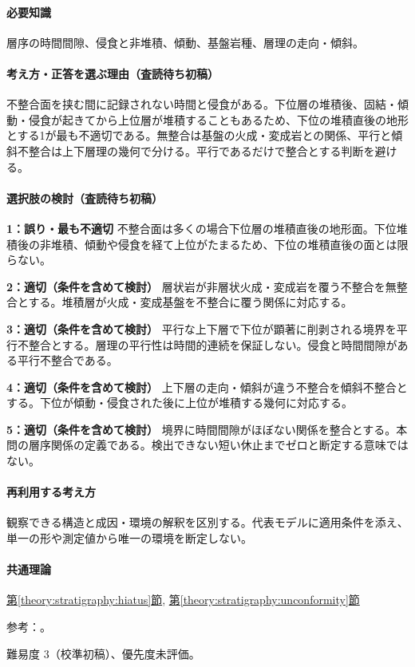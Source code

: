 \paragraph{必要知識} 層序の時間間隙、侵食と非堆積、傾動、基盤岩種、層理の走向・傾斜。

\paragraph{考え方・正答を選ぶ理由（査読待ち初稿）} 不整合面を挟む間に記録されない時間と侵食がある。下位層の堆積後、固結・傾動・侵食が起きてから上位層が堆積することもあるため、下位の堆積直後の地形とする1が最も不適切である。無整合は基盤の火成・変成岩との関係、平行と傾斜不整合は上下層理の幾何で分ける。平行であるだけで整合とする判断を避ける。

\paragraph{選択肢の検討（査読待ち初稿）}\mbox{}\par

\noindent\textbf{1：誤り・最も不適切} 不整合面は多くの場合下位層の堆積直後の地形面。下位堆積後の非堆積、傾動や侵食を経て上位がたまるため、下位の堆積直後の面とは限らない。\par

\noindent\textbf{2：適切（条件を含めて検討）} 層状岩が非層状火成・変成岩を覆う不整合を無整合とする。堆積層が火成・変成基盤を不整合に覆う関係に対応する。\par

\noindent\textbf{3：適切（条件を含めて検討）} 平行な上下層で下位が顕著に削剥される境界を平行不整合とする。層理の平行性は時間的連続を保証しない。侵食と時間間隙がある平行不整合である。\par

\noindent\textbf{4：適切（条件を含めて検討）} 上下層の走向・傾斜が違う不整合を傾斜不整合とする。下位が傾動・侵食された後に上位が堆積する幾何に対応する。\par

\noindent\textbf{5：適切（条件を含めて検討）} 境界に時間間隙がほぼない関係を整合とする。本問の層序関係の定義である。検出できない短い休止までゼロと断定する意味ではない。\par

\paragraph{再利用する考え方} 観察できる構造と成因・環境の解釈を区別する。代表モデルに適用条件を添え、単一の形や測定値から唯一の環境を断定しない。

\paragraph{共通理論} \hyperref[theory:stratigraphy:hiatus]{第\ref*{theory:stratigraphy:hiatus}節}, \hyperref[theory:stratigraphy:unconformity]{第\ref*{theory:stratigraphy:unconformity}節}

\par 参考：\cite{strat_iu_unconformity}。

\par 難易度 3（校準初稿）、優先度未評価。
